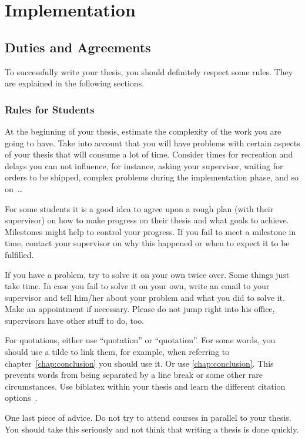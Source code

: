 \chapter{Implementation} \label{chap:impl}

\section{Duties and Agreements}

To successfully write your thesis, you should definitely respect some rules. They are explained in the following sections.

\subsection{Rules for Students}
At the beginning of your thesis, estimate the complexity of the work you are going to have. Take into account that you will have problems with certain aspects of your thesis that will consume a lot of time. Consider times for recreation and delays you can not influence, for instance, asking your supervisor, waiting for orders to be shipped, complex problems during the implementation phase, and so on~\dots

For some students it is a good idea to agree upon a rough plan (with their supervisor) on how to make progress on their thesis and what goals to achieve. Milestones might help to control your progress. If you fail to meet a milestone in time, contact your supervisor on why this happened or when to expect it to be fulfilled.

If you have a problem, try to solve it on your own twice over. Some things just take time. In case you fail to solve it on your own, write an email to your supervisor and tell him/her about your problem and what you did to solve it. Make an appointment if necessary. Please do not jump right into his office, supervisors have other stuff to do, too.

For quotations, either use ``quotation'' or \enquote{quotation}. For some words, you should use a tilde to link them, for example, when referring to chapter~\ref{chap:conclusion} you should use it. Or use \autoref{chap:conclusion}. This prevents words from being separated by a line break or some other rare circumstances. Use biblatex within your thesis and learn the different citation options~\cite{Xie:2008:SBS,Newsome:05:DTA}.

One last piece of advice. Do not try to attend courses in parallel to your thesis. You should take this seriously and not think that writing a thesis is done quickly.

